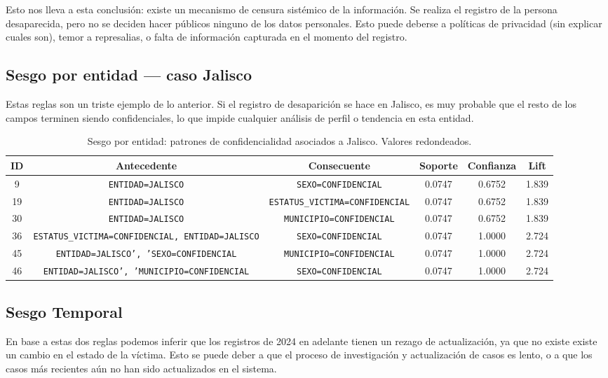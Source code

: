 Esto nos lleva a esta conclusión: existe un mecanismo de censura sistémico de la información. Se realiza el registro
de la persona desaparecida, pero no se deciden hacer públicos ninguno de los datos personales. Esto puede deberse a
políticas de privacidad (sin explicar cuales son), temor a represalias, o falta de información capturada en el momento
del registro.

\subsection{Sesgo por entidad — caso Jalisco}

Estas reglas son un triste ejemplo de lo anterior. Si el registro de desaparición se hace en Jalisco, es muy probable
que el resto de los campos terminen siendo confidenciales, lo que impide cualquier análisis de perfil o tendencia en esta entidad.

\begin{table}[H]
\centering
\small
\begin{tabular}{cccccc}
\hline
ID & Antecedente & Consecuente & Soporte & Confianza & Lift \\
\hline
9  & \texttt{ENTIDAD=JALISCO} & \texttt{SEXO=CONFIDENCIAL} & 0.0747 & 0.6752 & 1.839 \\
19 & \texttt{ENTIDAD=JALISCO} & \texttt{ESTATUS\_VICTIMA=CONFIDENCIAL} & 0.0747 & 0.6752 & 1.839 \\
30 & \texttt{ENTIDAD=JALISCO} & \texttt{MUNICIPIO=CONFIDENCIAL} & 0.0747 & 0.6752 & 1.839 \\
36 & \texttt{ESTATUS\_VICTIMA=CONFIDENCIAL, ENTIDAD=JALISCO} & \texttt{SEXO=CONFIDENCIAL} & 0.0747 & 1.0000 & 2.724 \\
45 & \texttt{ENTIDAD=JALISCO', 'SEXO=CONFIDENCIAL} & \texttt{MUNICIPIO=CONFIDENCIAL} & 0.0747 & 1.0000 & 2.724 \\
46 & \texttt{ENTIDAD=JALISCO', 'MUNICIPIO=CONFIDENCIAL} & \texttt{SEXO=CONFIDENCIAL} & 0.0747 & 1.0000 & 2.724 \\
\hline
\end{tabular}
\caption{Sesgo por entidad: patrones de confidencialidad asociados a Jalisco. Valores redondeados.}
\label{tab:jalisco_confidencialidad}
\end{table}

\subsection{Sesgo Temporal}

En base a estas dos reglas podemos inferir que los registros de 2024 en adelante
tienen un rezago de actualización, ya que no existe existe un cambio en el estado
de la víctima. Esto se puede deber a que el proceso de investigación y actualización
de casos es lento, o a que los casos más recientes aún no han sido actualizados en el
sistema.

